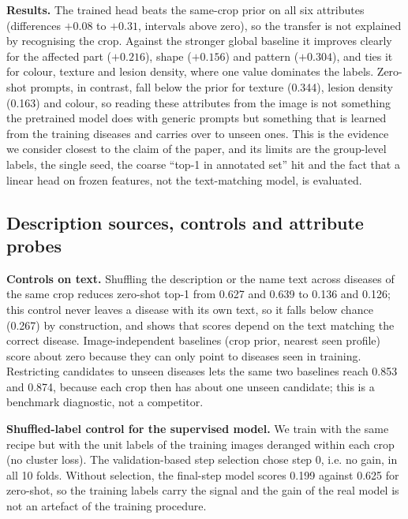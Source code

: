 \documentclass[11pt]{article}
\begin{document}
\begin{table}[t]\centering\small
\resizebox{\linewidth}{!}{}
\caption{Image-to-symptom transfer to held-out diseases (10-fold CV, one seed). Fraction of test images whose top predicted value is among the annotated values of their group, macro over diseases. The trained head is a linear layer on frozen image features trained on seen diseases only. Differences are with bootstrap 95\% intervals over folds.}\label{tab:transfer}
\end{table}

\textbf{Results.} The trained head beats the same-crop prior on all six attributes (differences $+0.08$ to $+0.31$, intervals above zero), so the transfer is not explained by recognising the crop. Against the stronger global baseline it improves clearly for the affected part ($+0.216$), shape ($+0.156$) and pattern ($+0.304$), and ties it for colour, texture and lesion density, where one value dominates the labels. Zero-shot prompts, in contrast, fall below the prior for texture (0.344), lesion density (0.163) and colour, so reading these attributes from the image is not something the pretrained model does with generic prompts but something that is learned from the training diseases and carries over to unseen ones. This is the evidence we consider closest to the claim of the paper, and its limits are the group-level labels, the single seed, the coarse ``top-1 in annotated set'' hit and the fact that a linear head on frozen features, not the text-matching model, is evaluated.

\subsection{Description sources, controls and attribute probes}\label{sec:sym}
\textbf{Controls on text.} Shuffling the description or the name text across diseases of the same crop reduces zero-shot top-1 from 0.627 and 0.639 to 0.136 and 0.126; this control never leaves a disease with its own text, so it falls below chance (0.267) by construction, and shows that scores depend on the text matching the correct disease. Image-independent baselines (crop prior, nearest seen profile) score about zero because they can only point to diseases seen in training. Restricting candidates to unseen diseases lets the same two baselines reach 0.853 and 0.874, because each crop then has about one unseen candidate; this is a benchmark diagnostic, not a competitor.

\textbf{Shuffled-label control for the supervised model.} We train with the same recipe but with the unit labels of the training images deranged within each crop (no cluster loss). The validation-based step selection chose step 0, i.e. no gain, in all 10 folds. Without selection, the final-step model scores 0.199 against 0.625 for zero-shot, so the training labels carry the signal and the gain of the real model is not an artefact of the training procedure.
\end{document}
